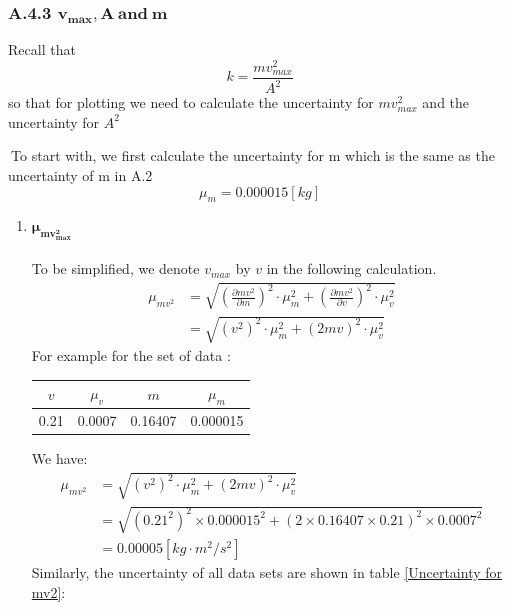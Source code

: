\documentclass[11pt,a4paper]{article}
\begin{document}
\subsubsection*{A.4.3 $\mathbf{v_{max}, A\ and\ m}$}
\qquad Recall that $$k=\frac{mv_{max}^2}{A^2}$$
\qquad so that for plotting we need to calculate the uncertainty for $mv_{max}^2$ and the uncertainty for $A^2$\par
$\ $To start with, we first calculate the uncertainty for m which is the same as the uncertainty of m in A.2
$$\mu_m=0.000015[kg]$$
\begin{enumerate}
    \item $\mathbf{\mu_{mv_{max}^2}}$
    \\
    \\ To be simplified, we denote $v_{max}$ by $v$ in the following calculation.\\
    \begin{equation*}
        \begin{split}
        \mu_{mv^2}&=\sqrt{\left(\frac{\partial mv^2}{\partial m}\right)^2\cdot \mu_m^2+\left(\frac{\partial mv^2}{\partial v}\right)^2\cdot \mu_v^2}\\
        &=\sqrt{\left(v^2\right)^2\cdot \mu_m^2+\left(2mv\right)^2\cdot \mu_v^2}
        \end{split}
    \end{equation*}
    For example for the set of data :
    \begin{table}[h]
        \centering
        \begin{tabular}{cccc}
        $v$  & $\mu_v$ & $m$     & $\mu_m$ \\\hline
        0.21 & 0.0007  & 0.16407 & 0.000015
        \end{tabular}
        \end{table}\par
    We have: 
    \begin{equation*}
        \begin{split}
            \mu_{mv^2}&=\sqrt{\left(v^2\right)^2\cdot \mu_m^2+\left(2mv\right)^2\cdot \mu_v^2}\\
            &=\sqrt{(0.21^2)^2\times 0.000015^2+(2\times 0.16407\times 0.21)^2\times 0.0007^2}\\
            &=0.00005[kg\cdot m^2/s^2]
        \end{split}
    \end{equation*}
     Similarly, the uncertainty of all data sets are shown in table \ref{Uncertainty for mv2}:
    \begin{table}[h]

\end{table}
\end{enumerate}
\end{document}
